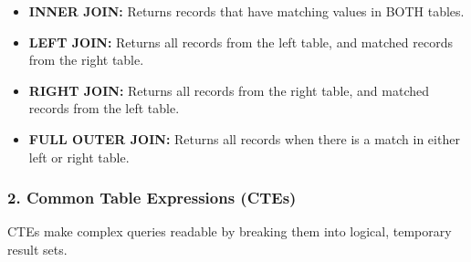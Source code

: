 \begin{itemize}
\item
  \textbf{INNER JOIN:} Returns records that have matching values in BOTH
  tables.

\begin{Shaded}
\begin{Highlighting}[]
  \OperatorTok{=}
\end{Highlighting}
\end{Shaded}
\item
  \textbf{LEFT JOIN:} Returns all records from the left table, and
  matched records from the right table.

\begin{Shaded}
\begin{Highlighting}[]
  \OperatorTok{=}
\end{Highlighting}
\end{Shaded}
\item
  \textbf{RIGHT JOIN:} Returns all records from the right table, and
  matched records from the left table.
\item
  \textbf{FULL OUTER JOIN:} Returns all records when there is a match in
  either left or right table.
\end{itemize}

\subsubsection{2. Common Table Expressions
(CTEs)}\label{common-table-expressions-ctes-1}

CTEs make complex queries readable by breaking them into logical,
temporary result sets.

\begin{Shaded}
\begin{Highlighting}[]
\NormalTok{ (}
     
     \OperatorTok{\textgreater{}} 
\NormalTok{)}
 \OperatorTok{=}
\end{Highlighting}
\end{Shaded}

